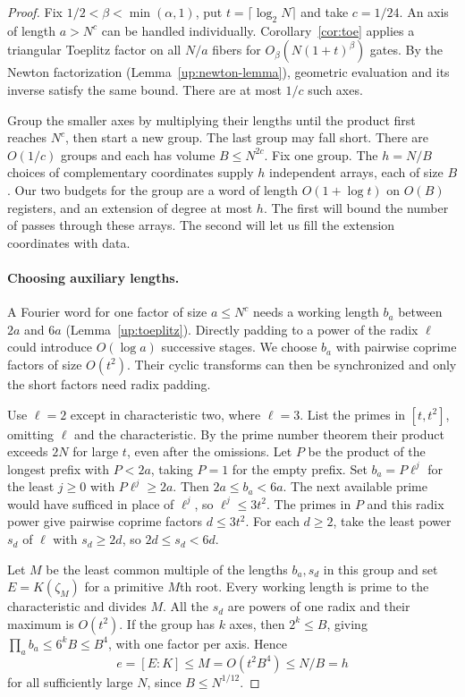 \begin{proof}
Fix \(1/2<\beta<\min(\alpha,1)\), put \(t=\lceil\log_2 N\rceil\) and
take \(c=1/24\). An axis of length \(a>N^c\) can be handled individually.
Corollary~\ref{cor:toe} applies a triangular Toeplitz factor on all
\(N/a\) fibers for \(O_\beta(N(1+t)^\beta)\) gates. By the Newton
factorization (Lemma~\ref{up:newton-lemma}), geometric evaluation and
its inverse satisfy the same bound. There are at most \(1/c\) such axes.

Group the smaller axes by multiplying their lengths until the product
first reaches \(N^c\), then start a new group. The last group may
fall short. There are \(O(1/c)\) groups and each has volume
\(B\le N^{2c}\). Fix one group. The \(h=N/B\) choices of complementary
coordinates supply \(h\) independent arrays, each of size \(B\).
Our two budgets for the group are a word of length \(O(1+\log t)\)
on \(O(B)\) registers, and an extension of degree at most \(h\).
The first will bound the number of passes through these arrays.
The second will let us fill the extension coordinates with data.

\paragraph{Choosing auxiliary lengths.}
A Fourier word for one factor of size \(a\le N^c\) needs a working
length \(b_a\) between \(2a\) and \(6a\) (Lemma~\ref{up:toeplitz}).
Directly padding to a power of the radix \(\ell\) could introduce
\(O(\log a)\) successive stages. We choose \(b_a\) with pairwise
coprime factors of size \(O(t^2)\). Their cyclic transforms can then
be synchronized and only the short factors need radix padding.

Use \(\ell=2\) except in characteristic two, where \(\ell=3\).
List the primes in \([t,t^2]\), omitting \(\ell\) and the
characteristic. By the prime number theorem their product exceeds
\(2N\) for large \(t\), even after the omissions. Let \(P\) be the
product of the longest prefix with \(P<2a\), taking \(P=1\) for the
empty prefix. Set \(b_a=P\ell^j\) for the least \(j\ge0\) with
\(P\ell^j\ge2a\). Then \(2a\le b_a<6a\). The next available prime
would have sufficed in place of \(\ell^j\), so \(\ell^j\le3t^2\).
The primes in \(P\) and this radix power give pairwise coprime
factors \(d\le3t^2\). For each \(d\ge2\), take the least power \(s_d\)
of \(\ell\) with \(s_d\ge2d\), so \(2d\le s_d<6d\).

Let \(M\) be the least common multiple of the lengths \(b_a,s_d\)
in this group and set \(E=K(\zeta_M)\) for a primitive \(M\)th root.
Every working length is prime to the characteristic and divides \(M\).
All the \(s_d\) are powers of one radix and their maximum is \(O(t^2)\).
If the group has \(k\) axes, then \(2^k\le B\), giving
\(\prod_a b_a\le6^k B\le B^4\), with one factor per axis. Hence
\begin{equation}\label{up:capacity}
               e=[E:K]\le M=O(t^2B^4)\le N/B=h
\end{equation}
for all sufficiently large \(N\), since \(B\le N^{1/12}\).


\end{proof}
